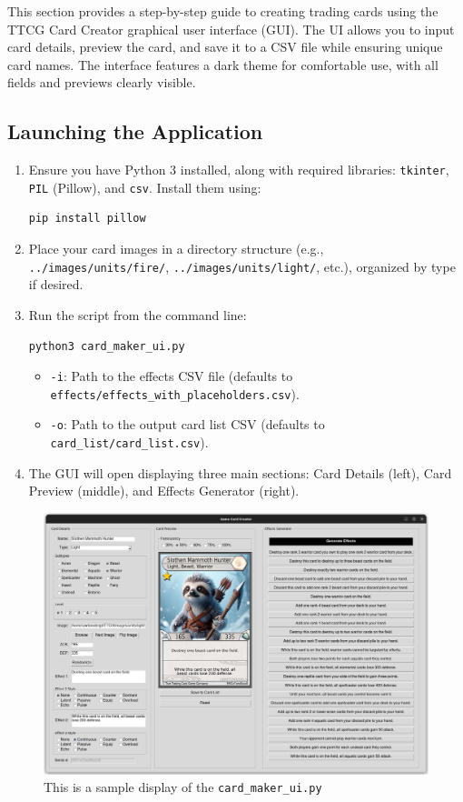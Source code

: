 This section provides a step-by-step guide to creating trading cards using the TTCG Card Creator graphical user interface (GUI). The UI allows you to input card details, preview the card, and save it to a CSV file while ensuring unique card names. The interface features a dark theme for comfortable use, with all fields and previews clearly visible.

\subsection{Launching the Application}

\begin{enumerate}
    \item Ensure you have Python 3 installed, along with required libraries: \texttt{tkinter}, \texttt{PIL} (Pillow), and \texttt{csv}. Install them using:
\begin{lstlisting}[style=terminalstyle]
pip install pillow
\end{lstlisting}
    \item Place your card images in a directory structure (e.g., \texttt{../images/units/fire/}, \texttt{../images/units/light/}, etc.), organized by type if desired.
    \item Run the script from the command line:
\begin{lstlisting}[style=terminalstyle]
python3 card_maker_ui.py
\end{lstlisting}
          \begin{itemize}
              \item \texttt{-i}: Path to the effects CSV file (defaults to \texttt{effects/effects\_with\_placeholders.csv}).
              \item \texttt{-o}: Path to the output card list CSV (defaults to \texttt{card\_list/card\_list.csv}).
          \end{itemize}
    \item The GUI will open displaying three main sections: Card Details (left), Card Preview (middle), and Effects Generator (right).
\end{enumerate}

\begin{figure}[h]
	\centering
	\includegraphics[width=\textwidth]{images/ui_sample.png} 
	\caption{This is a sample display of the \texttt{card\_maker\_ui.py}}
	\label{fig:sample_ui_window}
\end{figure}

